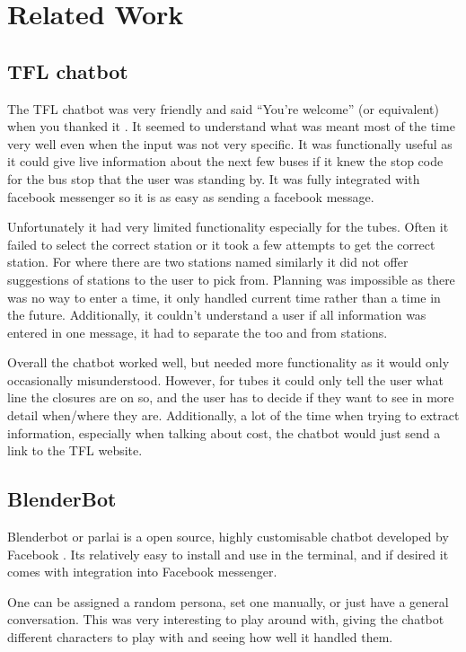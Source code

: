 \documentclass[11pt]{article}
\begin{document}
	\section{Related Work} \label {RelatedWork}
		
	\subsection{TFL chatbot}
	The TFL chatbot was very friendly and said “You're welcome” (or equivalent) when you thanked it \citet{TflTravelBot}. It seemed to understand what was meant most of the time very well even when the input was not very specific. It was functionally useful as it could give live information about the next few buses if it knew the stop code for the bus stop that the user was standing by. It was fully integrated with facebook messenger so it is as easy as sending a facebook message.
	
	Unfortunately it had very limited functionality especially for the tubes. Often it failed to select the correct station or it took a few attempts to get the correct station. For where there are two stations named similarly it did not offer suggestions of stations to the user to pick from. Planning was impossible as there was no way to enter a time, it only handled current time rather than a time in the future. Additionally, it couldn't understand a user if all information was entered in one message, it had to separate the too and from stations.
	
	Overall the chatbot worked well, but needed more functionality as it would only occasionally misunderstood. However, for tubes it could only tell the user what line the closures are on so, and the user has to decide if they want to see in more detail when/where they are. Additionally, a lot of the time when trying to extract information, especially when talking about cost, the chatbot would just send a link to the TFL website. 
	
	\subsection{BlenderBot}
	Blenderbot or parlai is a open source, highly customisable chatbot developed by Facebook \citet{roller2020recipes}. Its relatively easy to install and use in the terminal, and if desired it comes with integration into Facebook messenger. 
	
	One can be assigned a random persona, set one manually, or just have a general conversation. This was very interesting to play around with, giving the chatbot different characters to play with and seeing how well it handled them. 
	
\end{document}
